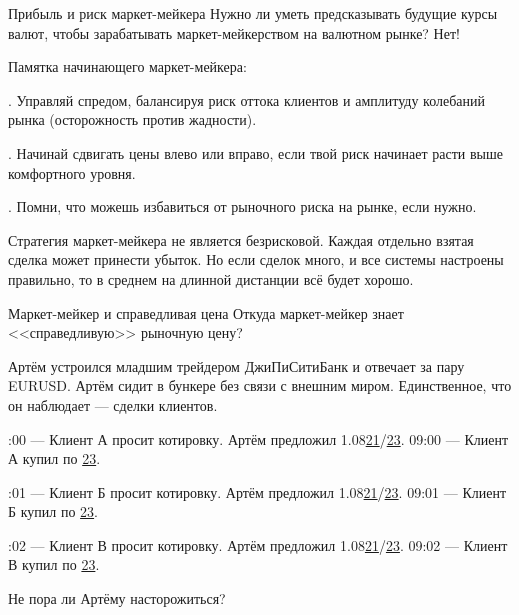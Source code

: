 \documentclass{beamer}
\newcommand{\eurusdBigFigures}{1.08}
\begin{document}
\begin{frame}{Прибыль и риск маркет-мейкера}
\justify
Нужно ли уметь предсказывать будущие курсы валют, чтобы зарабатывать маркет-мейкерством на валютном рынке? Нет!

\justify
Памятка начинающего маркет-мейкера:

. Управляй спредом, балансируя риск оттока клиентов и амплитуду колебаний рынка (осторожность против жадности).

. Начинай сдвигать цены влево или вправо, если твой риск начинает расти выше комфортного уровня.

. Помни, что можешь избавиться от рыночного риска на рынке, если нужно.

\justify
Стратегия маркет-мейкера не является безрисковой. Каждая отдельно взятая сделка
может принести убыток. Но если сделок много, и все системы настроены правильно,
то в среднем на длинной дистанции всё будет хорошо.
\end{frame}



\begin{frame}{Маркет-мейкер и справедливая цена}
\justify
Откуда маркет-мейкер знает <<справедливую>> рыночную цену?

\justify
Артём устроился младшим трейдером ДжиПиСитиБанк и отвечает за пару EURUSD. Артём сидит в бункере без связи с внешним миром. Единственное, что он наблюдает --- сделки клиентов.

:00 --- Клиент А просит котировку. Артём предложил \eurusdBigFigures\underline{21}/\underline{23}. 
09:00 --- Клиент А купил по \underline{23}.

:01 --- Клиент Б просит котировку. Артём предложил \eurusdBigFigures\underline{21}/\underline{23}.
09:01 --- Клиент Б купил по \underline{23}.

:02 --- Клиент В просит котировку. Артём предложил \eurusdBigFigures\underline{21}/\underline{23}. 
09:02 --- Клиент В купил по \underline{23}.

\justify
Не пора ли Артёму насторожиться?
\end{frame}
\end{document}
